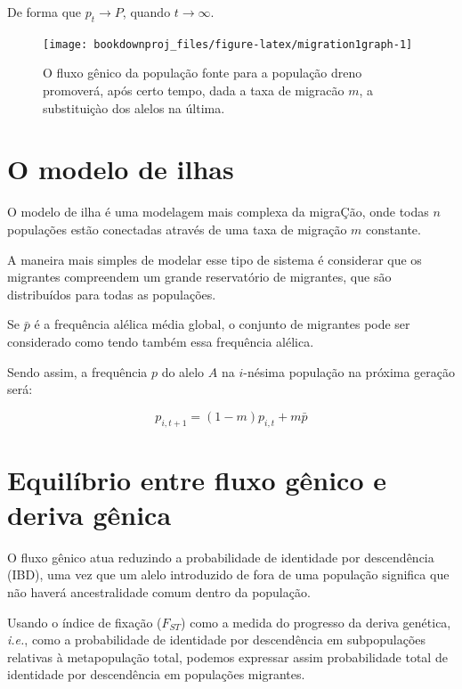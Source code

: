 \documentclass[
]{book}
\begin{document}
De forma que \(p_t \to P\), quando \(t \to \infty\).

\begin{figure}

{\centering \texttt{[image: bookdownproj\_files/figure-latex/migration1graph-1]} 

}

\caption{O fluxo gênico da população fonte para a população dreno promoverá, após certo tempo, dada a taxa de migracão $m$, a substituiçào dos alelos na última.}\label{fig:migration1graph}
\end{figure}

\hypertarget{o-modelo-de-ilhas}{%
\section{O modelo de ilhas}\label{o-modelo-de-ilhas}}

O modelo de ilha é uma modelagem mais complexa da migraÇão, onde todas \(n\) populações estão conectadas através de uma taxa de migração \(m\) constante.

A maneira mais simples de modelar esse tipo de sistema é considerar que os migrantes compreendem um grande reservatório de migrantes, que são distribuídos para todas as populações.

Se \(\bar{p}\) é a frequência alélica média global, o conjunto de migrantes pode ser considerado como tendo também essa frequência alélica.

Sendo assim, a frequência \(p\) do alelo \(A\) na \(i\)-nésima população na próxima geração será:

\[p_{i,t+1} = (1-m)p_{i, t} + m\bar{p}\]

\hypertarget{equiluxedbrio-entre-fluxo-guxeanico-e-deriva-guxeanica}{%
\section{Equilíbrio entre fluxo gênico e deriva gênica}\label{equiluxedbrio-entre-fluxo-guxeanico-e-deriva-guxeanica}}

O fluxo gênico atua reduzindo a probabilidade de identidade por descendência (IBD), uma vez que um alelo introduzido de fora de uma população significa que não haverá ancestralidade comum dentro da população.

Usando o índice de fixação (\(F_{ST}\)) como a medida do progresso da deriva genética, \emph{i.e.}, como a probabilidade de identidade por descendência em subpopulações relativas à metapopulação total, podemos expressar assim probabilidade total de identidade por descendência em populações migrantes.
\end{document}
